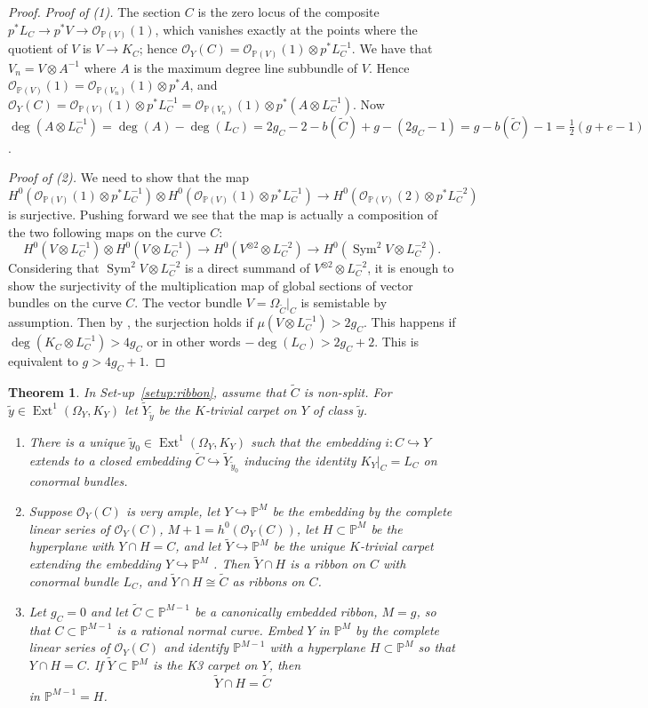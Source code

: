 \documentclass[11pt,reqno]{amsart}
\theoremstyle{plain}
\newtheorem{theorem}{Theorem}[section]
\theoremstyle{definition}
\newcommand{\PP}{\mathbb{P}}
\newcommand{\PM}{\mathbb{P}^M}
\newcommand{\OO}{\mathcal{O}}
\newcommand{\Ext}{\operatorname{Ext}}
\newcommand{\Yt}{\widetilde{Y}}
\newcommand{\Ct}{\widetilde{C}}
\newcommand{\yt}{\tilde{y}}
\begin{document}
\begin{proof}
\emph{Proof of (1).} The section $C$ is the zero locus of the composite $p^*L_C\to p^*V\to\OO_{\PP(V)}(1)$, which vanishes exactly at the points where the quotient of $V$ is $V\to K_C$; hence $\OO_Y(C)=\OO_{\PP(V)}(1)\otimes p^*L_C^{-1}$. We have that $V_n=V\otimes A^{-1}$ where $A$ is the maximum degree line subbundle of $V$. Hence $\OO_{\PP(V)}(1)=\OO_{\PP(V_n)}(1)\otimes p^*A$, and $\OO_Y(C)=\OO_{\PP(V)}(1)\otimes p^*L_C^{-1}=\OO_{\PP(V_n)}(1)\otimes p^*(A\otimes L_C^{-1})$. Now $\deg(A\otimes L_C^{-1})=\deg(A)-\deg(L_C)=2g_C-2-b(\Ct)+g-(2g_C-1)=g-b(\Ct)-1=\frac12(g+e-1)$.

\emph{Proof of (2).} We need to show that the map $H^0(\OO_{\PP(V)}(1)\otimes p^*L_C^{-1})\otimes H^0(\OO_{\PP(V)}(1)\otimes p^*L_C^{-1})\to H^0(\OO_{\PP(V)}(2)\otimes p^*L_C^{-2})$ is surjective. Pushing forward we see that the map is actually a composition of the two following maps on the curve $C$:
\[
H^0(V\otimes L_C^{-1})\otimes H^0(V\otimes L_C^{-1})\to H^0(V^{\otimes2}\otimes L_C^{-2})\to H^0(\operatorname{Sym}^2V\otimes L_C^{-2}) .
\]
Considering that $\operatorname{Sym}^2V\otimes L_C^{-2}$ is a direct summand of $V^{\otimes2}\otimes L_C^{-2}$, it is enough to show the surjectivity of the multiplication map of global sections of vector bundles on the curve $C$. The vector bundle $V=\Omega_{\Ct}|_C$ is semistable by assumption. Then by \cite[Theorem~1]{But94}, the surjection holds if $\mu(V\otimes L_C^{-1})>2g_C$. This happens if $\deg(K_C\otimes L_C^{-1})>4g_C$ or in other words $-\deg(L_C)>2g_C+2$. This is equivalent to $g>4g_C+1$.
\end{proof}

\begin{theorem}\label{thm:extension}
In Set-up~\ref{setup:ribbon}, assume that $\Ct$ is non-split. For $\yt\in\Ext^1(\Omega_Y,K_Y)$ let $\Yt_{\yt}$ be the $K$-trivial carpet on $Y$ of class $\yt$.
\begin{enumerate}
\item There is a unique $\yt_0\in\Ext^1(\Omega_Y,K_Y)$ such that the embedding $i\colon C\hookrightarrow Y$ extends to a closed embedding $\Ct\hookrightarrow\Yt_{\yt_0}$ inducing the identity $K_Y|_C=L_C$ on conormal bundles.
\item Suppose $\OO_Y(C)$ is very ample, let $Y\hookrightarrow\PP^M$ be the embedding by the complete linear series of $\OO_Y(C)$, $M+1=h^0(\OO_Y(C))$, let $H\subset\PP^M$ be the hyperplane with $Y\cap H=C$, and let $\Yt\hookrightarrow\PP^M$ be the unique $K$-trivial carpet extending the embedding $Y\hookrightarrow\PP^M$ \cite[Proposition~3.2]{DM25}. Then $\Yt\cap H$ is a ribbon on $C$ with conormal bundle $L_C$, and $\Yt\cap H\cong\Ct$ as ribbons on $C$.
\item Let $g_C=0$ and let $\Ct\subset\PP^{M-1}$ be a canonically embedded ribbon, $M=g$, so that $C\subset\PP^{M-1}$ is a rational normal curve. Embed $Y$ in $\PM$ by the complete linear series of $\OO_Y(C)$ and identify $\PP^{M-1}$ with a hyperplane $H\subset\PM$ so that $Y\cap H=C$. If $\Yt\subset\PM$ is the K3 carpet on $Y$, then
\[
\Yt\cap H=\Ct
\]
in $\PP^{M-1}=H$.
\end{enumerate}
\end{theorem}
\end{document}
